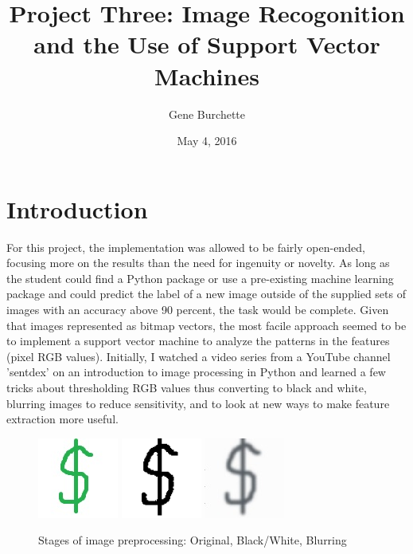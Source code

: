 \documentclass{article}
\title{Project Three: Image Recogonition and the Use of Support Vector Machines}
\author{Gene Burchette}
\date{May 4, 2016}
\begin{document}
\maketitle

\section{Introduction}
For this project, the implementation was allowed to be fairly open-ended, focusing more on the results than the need for ingenuity or novelty. As long as the student could find a Python package or use a pre-existing machine learning package and could predict the label of a new image outside of the supplied sets of images with an accuracy above 90 percent, the task would be complete. Given that images represented as bitmap vectors, the most facile approach seemed to be to implement a support vector machine to analyze the patterns in the features (pixel RGB values). Initially, I watched a video series from a YouTube channel 'sentdex' on an introduction to image processing in Python and learned a few tricks about thresholding RGB values thus converting to black and white, blurring images to reduce sensitivity, and to look at new ways to make feature extraction more useful. 

\begin{figure}[h!]
\centering
\includegraphics[scale=1.3]{testpt1.jpg}
\includegraphics[scale=1.3]{testpt2.jpg}
\includegraphics[scale=1.3]{testpt3.jpg}
\caption{Stages of image preprocessing: Original, Black/White, Blurring}
\label{fig:smiles}
\end{figure}
\end{document}
